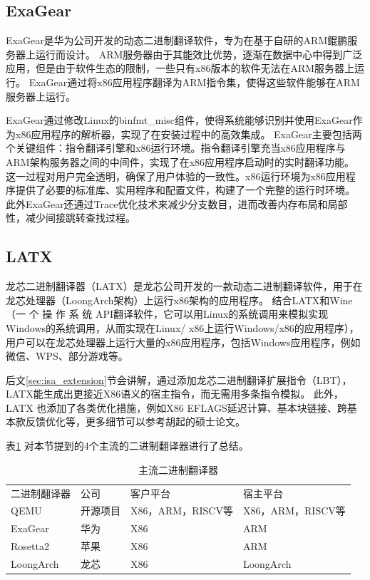 \subsection{ExaGear}

ExaGear是华为公司开发的动态二进制翻译软件，专为在基于自研的ARM鲲鹏服务器上运行而设计。
ARM服务器由于其能效比优势，逐渐在数据中心中得到广泛应用，但是由于软件生态的限制，一些只有x86版本的软件无法在ARM服务器上运行。
ExaGear通过将x86应用程序翻译为ARM指令集，使得这些软件能够在ARM服务器上运行。

ExaGear通过修改Linux的binfmt\_misc组件，使得系统能够识别并使用ExaGear作为x86应用程序的解析器，实现了在安装过程中的高效集成。
ExaGear主要包括两个关键组件：指令翻译引擎和x86运行环境。指令翻译引擎充当x86应用程序与ARM架构服务器之间的中间件，实现了在x86应用程序启动时的实时翻译功能。
这一过程对用户完全透明，确保了用户体验的一致性。x86运行环境为x86应用程序提供了必要的标准库、实用程序和配置文件，构建了一个完整的运行时环境。
此外ExaGear还通过Trace优化技术来减少分支数目，进而改善内存布局和局部性，减少间接跳转查找过程\cite{LvYandong2021}。

\subsection{LATX}

龙芯二进制翻译器（LATX）是龙芯公司开发的一款动态二进制翻译软件，用于在龙芯处理器（LoongArch架构）上运行x86架构的应用程序。
结合LATX和Wine\cite{amstadt1994wine}（一 个 操 作 系 统 API翻译软件，它可以用Linux的系统调用来模拟实现Windows的系统调用，从而实现在Linux/ x86上运行Windows/x86的应用程序），
用户可以在龙芯处理器上运行大量的x86应用程序，包括Windows应用程序，例如微信、WPS、部分游戏等。

后文\ref{sec:isa_extension}节会讲解，通过添加龙芯二进制翻译扩展指令（LBT），LATX能生成出更接近X86语义的宿主指令，而无需用多条指令模拟。
此外，LATX 也添加了各类优化措施，例如X86 EFLAGS延迟计算、基本块链接、跨基本款反馈优化等，更多细节可以参考胡起的硕士论文\cite{HuQi2023}。

表\ref{tab:BTs} 对本节提到的4个主流的二进制翻译器进行了总结。

\begin{table}[!htbp]
  \centering
  \caption{主流二进制翻译器}
  \label{tab:BTs}
    \begin{tabular}{llll}
    \rowcolor[HTML]{FBE5D6} 
    二进制翻译器    & 公司   & 客户平台           & 宿主平台           \\
    QEMU      & 开源项目 & X86，ARM，RISCV等 & X86，ARM，RISCV等  \\
    ExaGear   & 华为   & X86            & ARM            \\
    Rosetta2  & 苹果   & X86            & ARM            \\
    LoongArch & 龙芯   & X86            & LoongArch      
    \end{tabular}
    \end{table}

